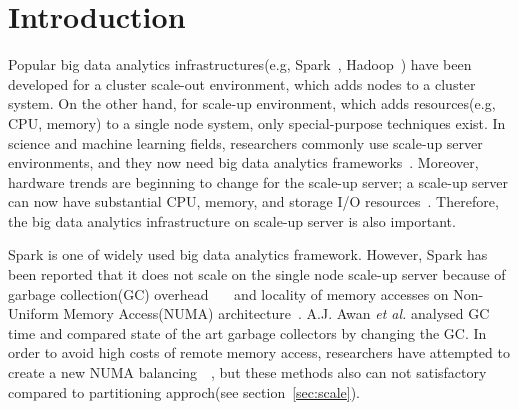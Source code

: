 \section{Introduction} \label{sec:introduction}
Popular big data analytics infrastructures(e.g, Spark~\cite{Zaharia2012RDD},
Hadoop~\cite{Shvachko2010HDF}) have been developed for a cluster scale-out
environment, which adds nodes to a cluster system.
On the other hand, for scale-up environment, which adds resources(e.g, CPU, memory)
to a single node system, only special-purpose techniques exist.
In science and machine learning fields, researchers
commonly use scale-up server environments, and they now need big data analytics
frameworks~\cite{Chaimov2016SSH}.
Moreover, hardware trends are beginning to change for the scale-up
server; a scale-up server can now have substantial CPU, memory,
and storage I/O resources~\cite{Appuswamy2013SVS}.
Therefore, the big data analytics infrastructure on scale-up server is
also important.

Spark is one of widely used big data analytics framework.
However, Spark has been reported that it does
not scale on the single node scale-up server because of garbage
collection(GC)
overhead~\cite{Ahsan2016SVS}~\cite{Ousterhout2015MSP}~\cite{Maas2016THL} and
locality of memory accesses on Non-Uniform Memory Access(NUMA)
architecture~\cite{Cao2016ADS}.
A.J. Awan \textit{et al.} analysed GC time and compared state of the art
garbage collectors by changing the GC.
In order to avoid high costs of remote memory access, researchers have
attempted to create a new NUMA balancing~\cite{Dashti2013TMH}~\cite{AutoNUMA}, but
these methods also can not satisfactory compared to partitioning approch(see section~\ref{sec:scale}).


